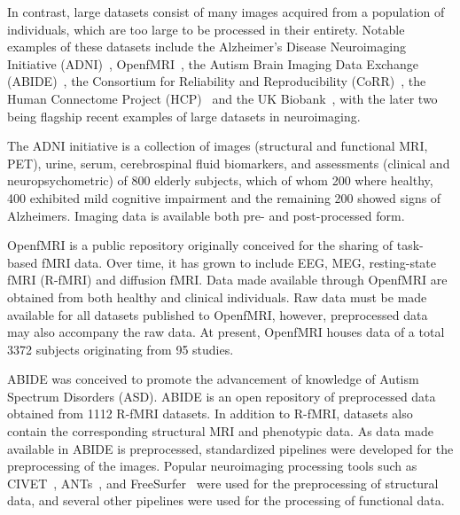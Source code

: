             In contrast, large datasets consist of many images acquired from
            a population of individuals, which are too large to be processed in their
            entirety. Notable examples of these datasets include the Alzheimer's
            Disease Neuroimaging Initiative
            (ADNI)~\cite{doi:10.1002/jmri.21049},
            OpenfMRI~\cite{POLDRACK2017259}, the Autism Brain Imaging Data
            Exchange (ABIDE)~\cite{Di-Martino:2013aa}, the Consortium for
            Reliability and Reproducibility (CoRR)~\cite{Zuo:2014aa}, the Human
            Connectome Project (HCP)~\cite{VANESSEN201362} and the UK
            Biobank~\cite{Miller:2016aa}, with the later two being flagship
            recent examples of large datasets in neuroimaging.

            The ADNI initiative is a collection of images (structural and
            functional MRI, PET), urine, serum, cerebrospinal fluid biomarkers,
            and assessments (clinical and neuropsychometric) of 800 elderly
            subjects, which of whom 200 where healthy, 400 exhibited mild
            cognitive impairment and the remaining 200 showed signs of
            Alzheimers. Imaging data is available both pre- and post-processed
            form.

            OpenfMRI is a public repository originally conceived for the sharing
            of task-based fMRI data. Over time, it has grown to include EEG,
            MEG, resting-state fMRI (R-fMRI) and diffusion fMRI. Data made
            available through OpenfMRI are obtained from both healthy and
            clinical individuals. Raw data must be made available for all
            datasets published to OpenfMRI, however, preprocessed data may also
            accompany the raw data. At present, OpenfMRI houses data of a total
            3372 subjects originating from 95 studies.

            ABIDE was conceived to promote the advancement of knowledge of
            Autism Spectrum Disorders (ASD).
            ABIDE is an open repository of preprocessed data obtained from 1112
            R-fMRI datasets. In addition to R-fMRI, datasets also contain the
            corresponding structural MRI and phenotypic data. As data made
            available in ABIDE is preprocessed, standardized pipelines were
            developed for the preprocessing of the images. Popular neuroimaging
            processing tools such as CIVET~\cite{citation-0},
            ANTs~\cite{avants2009advanced}, and FreeSurfer~\cite{FISCHL2012774}
            were used for the preprocessing of structural data, and several
            other pipelines were used for the processing of functional data.


